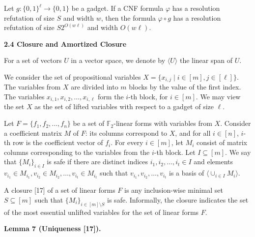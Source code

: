 \documentclass[10pt,a4paper]{article}
\begin{document}
Let $g:\{0,1\}^{\ell}\to\{0,1\}$ be a gadget.
If a CNF formula $\varphi$ has a resolution refutation of size $S$ and width $w$,
then the formula $\varphi\circ g$ has a resolution refutation of size
$S2^{O(w\ell)}$ and width $O(w\ell)$.\par



\par\medskip\noindent\textbf{
2.4 Closure and Amortized Closure}\par


For a set of vectors $U$ in a vector space, we denote by $\langle U\rangle$ the linear span of $U$.\par



We consider the set of propositional variables $X=\{x_{i,j}\mid i\in[m],j\in[\ell]\}$.
The variables from $X$ are divided into $m$ blocks by the value of the first index.
The variables $x_{i,1},x_{i,2},\dots,x_{i,\ell}$ form the $i$-th block, for $i\in[m]$.
We may view the set $X$ as the set of lifted variables with respect to a gadget of size $\ell$.\par



Let $F=\{f_{1},f_{2},\dots,f_{n}\}$ be a set of $\mathbb{F}_{2}$-linear forms with variables from $X$.
Consider a coefficient matrix $M$ of $F$: its columns correspond to $X$, and for all $i\in[n]$,
$i$-th row is the coefficient vector of $f_{i}$.
For every $i\in[m]$, let $M_{i}$ consist of matrix columns corresponding to the variables from
the $i$-th block.
Let $I\subseteq[m]$.
We say that $\{M_{i}\}_{i\in I}$ is safe if there are distinct indices $i_{1},i_{2},\dots,i_{t}\in I$
and elements $v_{i_{1}}\in M_{i_{1}},v_{i_{2}}\in M_{i_{2}},\dots,v_{i_{t}}\in M_{i_{t}}$ such that
$v_{i_{1}},v_{i_{2}},\dots,v_{i_{t}}$ is a basis of $\langle\cup_{i\in I}M_{i}\rangle$.\par



A closure [17] of a set of linear forms $F$ is any inclusion-wise minimal
set $S\subseteq[m]$ such that $\{M_{i}\}_{i\in[m]\setminus S}$ is safe.
Informally, the closure indicates the set of the most essential unlifted variables
for the set of linear forms $F$.\par



\par\medskip\noindent\textbf{
Lemma 7 (Uniqueness [17]).
}\par
\end{document}
